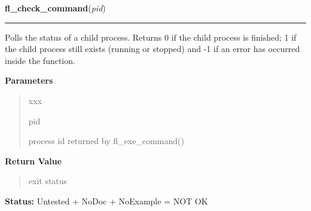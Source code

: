 \hspace{.8\funcindent}\begin{boxedminipage}{\funcwidth}

    \raggedright \textbf{fl\_check\_command}(\textit{pid})

    \vspace{-1.5ex}

    \rule{\textwidth}{0.5\fboxrule}
\setlength{\parskip}{2ex}
    Polls the status of a child process. Returns 0 if the child process is 
    finished; 1 if the child process still exists (running or stopped) and 
    -1 if an error has occurred inside the function.

\setlength{\parskip}{1ex}
      \textbf{Parameters}
      \vspace{-1ex}

      \begin{quote}
        \begin{Ventry}{xxx}

          \item[pid]

          process id returned by fl\_exe\_command()

        \end{Ventry}

      \end{quote}

      \textbf{Return Value}
    \vspace{-1ex}

      \begin{quote}
      exit status

      \end{quote}

\textbf{Status:} Untested + NoDoc + NoExample = NOT OK



    \end{boxedminipage}

    \label{xformslib:library:fl_popen}

    \vspace{0.5ex}

